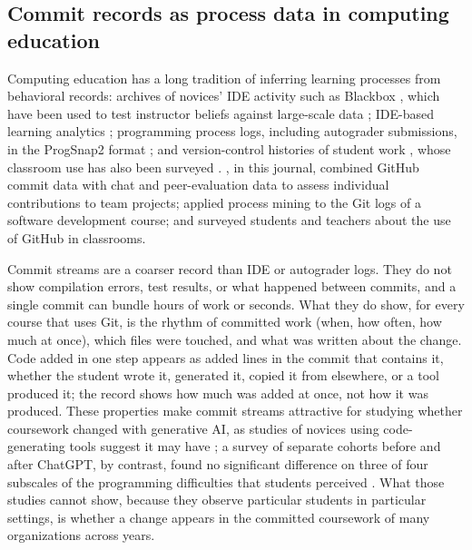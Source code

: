 \documentclass[acmsmall,screen,review,anonymous]{acmart}
\begin{document}
\subsection{Commit records as process data in computing education}

Computing education has a long tradition of inferring learning processes from behavioral records: archives of novices' IDE activity such as Blackbox \citep{brown2014blackbox, brown2022novice}, which have been used to test instructor beliefs against large-scale data \citep{brown2017mistakes}; IDE-based learning analytics \citep{hundhausen2017ide}; programming process logs, including autograder submissions, in the ProgSnap2 format \citep{price2020progsnap2}; and version-control histories of student work \citep{hundhausen2023github, macak2021process}, whose classroom use has also been surveyed \citep{hsing2019github}. \citet{hundhausen2023github}, in this journal, combined GitHub commit data with chat and peer-evaluation data to assess individual contributions to team projects; \citet{macak2021process} applied process mining to the Git logs of a software development course; and \citet{hsing2019github} surveyed students and teachers about the use of GitHub in classrooms.

Commit streams are a coarser record than IDE or autograder logs. They do not show compilation errors, test results, or what happened between commits, and a single commit can bundle hours of work or seconds. What they do show, for every course that uses Git, is the rhythm of committed work (when, how often, how much at once), which files were touched, and what was written about the change. Code added in one step appears as added lines in the commit that contains it, whether the student wrote it, generated it, copied it from elsewhere, or a tool produced it; the record shows how much was added at once, not how it was produced. These properties make commit streams attractive for studying whether coursework changed with generative AI, as studies of novices using code-generating tools suggest it may have \citep{kazemitabaar2024novices, prather2023weird, prather2024widening}; a survey of separate cohorts before and after ChatGPT, by contrast, found no significant difference on three of four subscales of the programming difficulties that students perceived \citep{bikangaada2026separate}. What those studies cannot show, because they observe particular students in particular settings, is whether a change appears in the committed coursework of many organizations across years.
\end{document}
